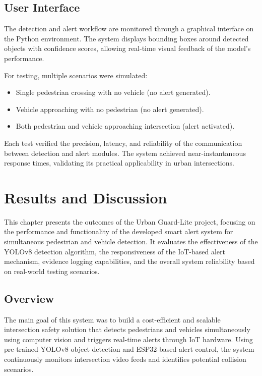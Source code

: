 \documentclass[a4paper, 12pt]{report}
\begin{document}
\section{User Interface}
The detection and alert workflow are monitored through a graphical interface on the Python environment. The system displays bounding boxes around detected objects with confidence scores, allowing real-time visual feedback of the model’s performance.

For testing, multiple scenarios were simulated:
\begin{itemize}[itemsep=-4pt]
    \item Single pedestrian crossing with no vehicle (no alert generated).
    \item Vehicle approaching with no pedestrian (no alert generated).
    \item Both pedestrian and vehicle approaching intersection (alert activated).
\end{itemize}
Each test verified the precision, latency, and reliability of the communication between detection and alert modules. The system achieved near-instantaneous response times, validating its practical applicability in urban intersections.



\chapter{Results and Discussion}

This chapter presents the outcomes of the Urban Guard-Lite project, focusing on the performance and functionality of the developed smart alert system for simultaneous pedestrian and vehicle detection. It evaluates the effectiveness of the YOLOv8 detection algorithm, the responsiveness of the IoT-based alert mechanism, evidence logging capabilities, and the overall system reliability based on real-world testing scenarios.

\section{Overview}
The main goal of this system was to build a cost-efficient and scalable intersection safety solution that detects pedestrians and vehicles simultaneously using computer vision and triggers real-time alerts through IoT hardware. Using pre-trained YOLOv8 object detection and ESP32-based alert control, the system continuously monitors intersection video feeds and identifies potential collision scenarios.
\end{document}
